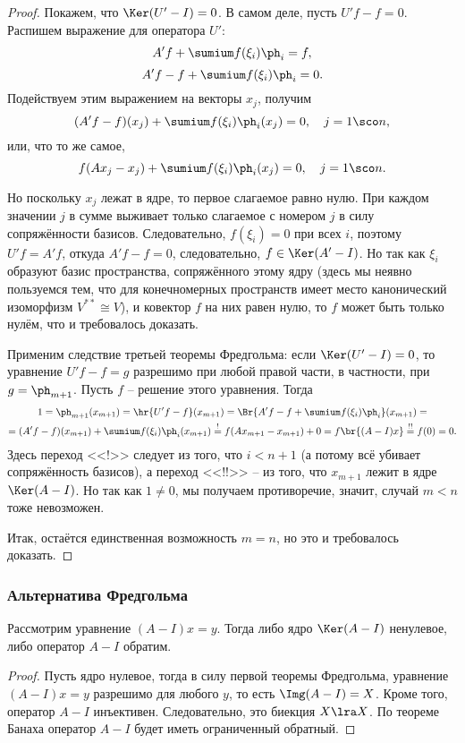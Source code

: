 \documentclass[a4paper]{article}
\begin{document}
\begin{proof}
Покажем, что $\Ker(U' - I) = 0$. В самом деле, пусть $U'f - f = 0$.
Распишем выражение для оператора $U'$:
$$A'f + \sumium f(\xi_i)\ph_i = f,$$
$$A'f - f + \sumium f(\xi_i)\ph_i = 0.$$
Подействуем этим выражением на векторы $x_j$, получим
$$(A'f-f)(x_j) + \sumium f(\xi_i)\ph_i(x_j) = 0, \quad j =1\sco n,$$
или, что то же самое,
$$f(Ax_j-x_j) + \sumium f(\xi_i)\ph_i(x_j) = 0, \quad j =1\sco n.$$

Но поскольку $x_j$ лежат в ядре, то первое слагаемое равно нулю. При каждом значении $j$ в сумме
выживает только слагаемое с номером $j$ в силу сопряжённости базисов.
Следовательно, $f(\xi_i) = 0$ при всех $i$, поэтому $U'f = A'f$, откуда $A'f - f = 0$, следовательно,
$f \in \Ker(A'-I)$. Но так как $\xi_i$ образуют базис пространства, сопряжённого этому ядру
(здесь мы неявно пользуемся тем, что для конечномерных пространств имеет место
канонический изоморфизм $V^{**} \cong V$),
и ковектор $f$ на них равен нулю, то $f$ может быть только нулём, что и требовалось доказать.

Применим следствие третьей теоремы Фредгольма: если $\Ker(U' - I) = 0$, то уравнение
$U'f - f = g$ разрешимо при любой правой части, в частности, при $g = \ph_{m+1}$.
Пусть $f$ -- решение этого уравнения. Тогда
\begin{multline*}
1 = \ph_{m+1}(x_{m+1}) = \hr{U'f - f}(x_{m+1}) = \Br{A'f - f + \sumium f(\xi_i)\ph_i}(x_{m+1}) =\\=
(A'f-f)(x_{m+1}) + \sumium f(\xi_i)\ph_i(x_{m+1}) \stackrel{!}{=}
f(Ax_{m+1} - x_{m+1}) + 0 = f\br{(A-I)x} \stackrel{!!}{=} f(0) = 0.
\end{multline*}
Здесь переход <<!>> следует из того, что $i < n+1$ (а потому всё убивает сопряжённость базисов),
а переход <<!!>> -- из того, что $x_{m+1}$ лежит в ядре $\Ker(A-I)$.
Но так как $1 \neq 0$, мы получаем противоречие, значит, случай $m < n$ тоже невозможен.

Итак, остаётся единственная возможность $m=n$, но это и требовалось доказать.
\end{proof}


\subsubsection{Альтернатива Фредгольма}

\begin{theorem}
Рассмотрим уравнение $(A-I)x = y$. Тогда либо ядро
$\Ker(A-I)$ ненулевое, либо оператор $A - I$ обратим.
\end{theorem}
\begin{proof}
Пусть ядро нулевое, тогда в силу первой теоремы Фредгольма,
уравнение $(A-I)x = y$ разрешимо для любого $y$, то есть $\Img(A-I) = X$.
Кроме того, оператор $A - I$ инъективен. Следовательно, это биекция $X \lra X$.
По теореме Банаха оператор $A - I$ будет иметь ограниченный обратный.
\end{proof}
\end{document}
